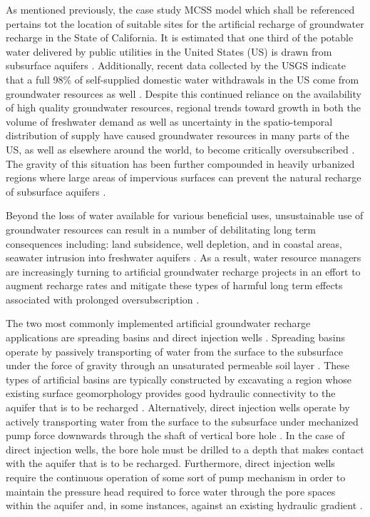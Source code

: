 As mentioned previously, the case study MCSS model which shall be referenced pertains tot the location of suitable sites for the artificial recharge of groundwater recharge in the State of California. It is estimated that one third of the potable water delivered by public utilities in the United States (US) is drawn from subsurface aquifers \cite{Hutson2004}. Additionally, recent data collected by the USGS indicate that a full 98\% of self-supplied domestic water withdrawals in the US come from groundwater resources as well \cite{Maupin2014}. Despite this  continued reliance on the availability of high quality groundwater resources, regional trends toward growth in both the volume of freshwater demand as well as uncertainty in the spatio-temporal distribution of supply have caused groundwater resources in many parts of the US, as well as elsewhere around the world, to become critically oversubscribed \cite{Karl2009, Wada2010}. The gravity of this situation has been further compounded in heavily urbanized regions where large areas of impervious surfaces can prevent the natural recharge of subsurface aquifers \cite{Shuster2005, Seiler2007}.

Beyond the loss of water available for various beneficial uses, unsustainable use of groundwater resources can result in a number of debilitating long term consequences including: land subsidence, well depletion, and in coastal areas, seawater intrusion into freshwater aquifers \cite{NRC2008, Gleeson2012}. As a result, water resource managers are increasingly turning to artificial groundwater recharge projects in an effort to augment recharge rates and mitigate these types of harmful long term effects associated with prolonged oversubscription \cite{Dillon2005,  Langridge2012, NRC2012}.

The two most commonly implemented artificial groundwater recharge applications are spreading basins and direct injection wells \cite{Asano1985, Bouwer1999}. Spreading basins operate by passively transporting of water from the surface to the subsurface under the force of gravity through an unsaturated permeable soil layer \cite{Pyne1995, Asano1998}. These types of artificial basins are typically constructed by excavating a region whose existing surface geomorphology provides good hydraulic connectivity to the aquifer that is to be recharged \cite{Marino1975a, Marino1975b}. Alternatively, direct injection wells operate by actively transporting water from the surface to the subsurface under mechanized pump force downwards through the shaft of vertical bore hole \cite{USEPA2001}. In the case of direct injection wells, the bore hole must be drilled to a depth that makes contact with the aquifer that is to be recharged. Furthermore, direct injection wells require the continuous operation of some sort of pump mechanism in order to maintain the pressure head required to force water through the pore spaces within the aquifer and, in some instances, against an existing hydraulic gradient \cite{Bouwer1991}.

